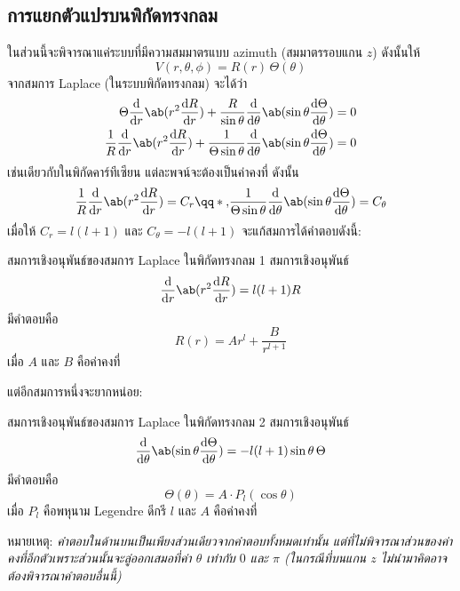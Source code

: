 \subsection{การแยกตัวแปรบนพิกัดทรงกลม}
ในส่วนนี้จะพิจารณาแค่ระบบที่มีความสมมาตรแบบ azimuth (สมมาตรรอบแกน $z$) ดังนั้นให้
\[V(r,\theta,\phi)=R(r)\,\Theta(\theta)\]
จากสมการ Laplace (ในระบบพิกัดทรงกลม) จะได้ว่า
\begin{align*}
    \Theta\odv{}{r}\ab(r^2\odv{R}{r})+\frac{R}{\sin\theta}\odv{}{\theta}\ab(\sin\theta\odv{\Theta}{\theta})&=0\\
    \frac{1}{R}\odv{}{r}\ab(r^2\odv{R}{r})+\frac{1}{\Theta\sin\theta}\odv{}{\theta}\ab(\sin\theta\odv{\Theta}{\theta})&=0
\end{align*}
เช่นเดียวกับในพิกัดคาร์ทีเซียน แต่ละพจน์จะต้องเป็นค่าคงที่ ดังนั้น
\[\frac{1}{R}\odv{}{r}\ab(r^2\odv{R}{r})=C_r\qq*{,}\frac{1}{\Theta\sin\theta}\odv{}{\theta}\ab(\sin\theta\odv{\Theta}{\theta})=C_\theta\]
เมื่อให้ $C_r=l(l+1)$ และ $C_\theta=-l(l+1)$ จะแก้สมการได้คำตอบดังนี้:
\begin{lawbox}{สมการเชิงอนุพันธ์ของสมการ Laplace ในพิกัดทรงกลม 1}
    สมการเชิงอนุพันธ์
    \begin{equation}
        \odv{}{r}\ab(r^2\odv{R}{r})=l(l+1)R
    \end{equation}
    มีคำตอบคือ
    \begin{equation}
        R(r)=Ar^l+\frac{B}{r^{l+1}}\label{sphere1}
    \end{equation}
    เมื่อ $A$ และ $B$ คือค่าคงที่
\end{lawbox}
แต่อีกสมการหนึ่งจะยากหน่อย:
\begin{lawbox}{สมการเชิงอนุพันธ์ของสมการ Laplace ในพิกัดทรงกลม 2}
    สมการเชิงอนุพันธ์
    \begin{equation}
        \odv{}{\theta}\ab(\sin\theta\odv{\Theta}{\theta})=-l(l+1)\sin\theta\,\Theta
    \end{equation}
    มีคำตอบคือ
    \begin{equation}
        \Theta(\theta)=A\cdot P_l(\cos\theta)\label{sphere2}
    \end{equation}
    เมื่อ $P_l$ คือพหุนาม Legendre ดีกรี $l$ และ $A$ คือค่าคงที่
\end{lawbox}
หมายเหตุ: \emph{คำตอบในด้านบนเป็นเพียงส่วนเดียวจากคำตอบทั้งหมดเท่านั้น แต่ที่ไม่พิจารณาส่วนของค่าคงที่อีกตัวเพราะส่วนนั้นจะลู่ออกเสมอที่ค่า $\theta$ เท่ากับ $0$ และ $\pi$ (ในกรณีที่บนแกน $z$ ไม่นำมาคิดอาจต้องพิจารณาคำตอบอื่นนี้)}

